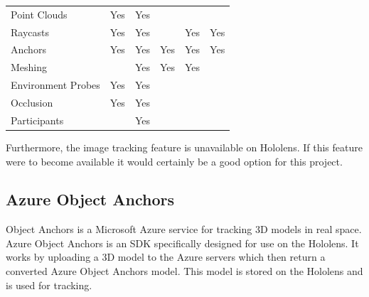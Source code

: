 \documentclass{l4proj}
\begin{document}
\begin{table}[hbt!]
\begin{tabular}{|l|c|cc|cc|}
Point Clouds                                            & Yes              & \multicolumn{1}{c|}{Yes}          &                   & \multicolumn{1}{c|}{}                  &                     \\
Raycasts                                                & Yes              & \multicolumn{1}{c|}{Yes}          &                   & \multicolumn{1}{c|}{Yes}               & Yes                 \\
Anchors                                                 & Yes              & \multicolumn{1}{c|}{Yes}          & Yes               & \multicolumn{1}{c|}{Yes}               & Yes                 \\
Meshing                                                 &                  & \multicolumn{1}{c|}{Yes}          & Yes               & \multicolumn{1}{c|}{Yes}               &                     \\
Environment Probes                                      & Yes              & \multicolumn{1}{c|}{Yes}          &                   & \multicolumn{1}{c|}{}                  &                     \\
Occlusion                                               & Yes              & \multicolumn{1}{c|}{Yes}          &                   & \multicolumn{1}{c|}{}                  &                     \\
Participants                                            &                  & \multicolumn{1}{c|}{Yes}          &                   & \multicolumn{1}{c|}{}                  &                     \\ \hline
\end{tabular}
\end{table}

Furthermore, the image tracking feature is unavailable on Hololens. If this feature were to become available it would certainly be a good option for this project.

\subsection{Azure Object Anchors}

Object Anchors is a Microsoft Azure service for tracking 3D models in real space. Azure Object Anchors is an SDK specifically designed for use on the Hololens. It works by uploading a 3D model to the Azure servers which then return a converted Azure Object Anchors model. This model is stored on the Hololens and is used for tracking. 
\end{document}
